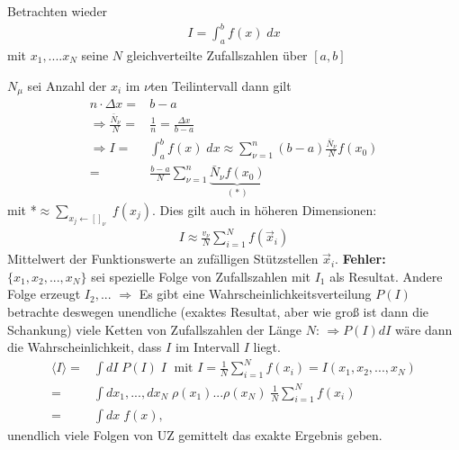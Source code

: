 \documentclass[12pt]{article}
\begin{document}
Betrachten wieder 
\begin{align}
I= \int_a^b f(x) \; dx
\end{align}
mit $x_1,....x_N$ seine $N$ gleichverteilte Zufallszahlen über $[a,b]$ %

$N_\mu$ sei Anzahl der $x_i$ im $\nu$ten Teilintervall dann gilt
\begin{align}
n \cdot \Delta x =& b-a \; \\
\Rightarrow \frac{\bar{N}_\nu}{N}=& \frac{1}{n}= \frac{\Delta x}{b-a} \\
\Rightarrow I= & \int_a^b f(x) \; dx \approx \sum_{\nu =1}^n (b-a)  \frac{\bar{N}_\nu}{N} f(x_0) \\
=& \frac{b-a}{N} \sum_{\nu =1}^n \underbrace{\bar{N}_\nu f(x_0)}_\text{( * )}
\end{align}
mit *$ \approx \sum_{x_j \leftarrow [ ]_\nu} \; f(x_j)$.
Dies gilt auch in höheren Dimensionen:
\begin{align}
I \approx \frac{v_\nu}{N} \sum_{i=1}^N f(\vec{x}_i)
\end{align}
Mittelwert der Funktionswerte an zufälligen Stützstellen $\vec{x}_i$.
\textbf{Fehler:} $\{ x_1, x_2,..., x_N\}$ sei spezielle Folge von Zufallszahlen mit $I_1$ als Resultat. Andere Folge erzeugt $I_2,...$ 
$\Rightarrow$ Es gibt eine Wahrscheinlichkeitsverteilung $P(I)$ %
betrachte deswegen unendliche (exaktes Resultat, aber wie groß ist dann die Schankung) viele Ketten von Zufallszahlen der Länge $N$: $\Rightarrow P(I) dI$ wäre dann die Wahrscheinlichkeit, dass $I$ im Intervall $I$ liegt.
\begin{align}
\langle I \rangle =& \int dI \; P(I) \; I \; \mbox{ mit } I= \frac{1}{N} \sum_{i=1}^N f(x_i)= I(x_1,x_2,...,x_N) \\
=& \int dx_1,...,dx_N \; \rho(x_1) ... \rho(x_N) \; \frac{1}{N} \sum_{i=1}^N f(x_i) \\
=& \int dx \; f(x) ,
\end{align}
unendlich viele Folgen von UZ gemittelt das exakte Ergebnis geben.
\end{document}
